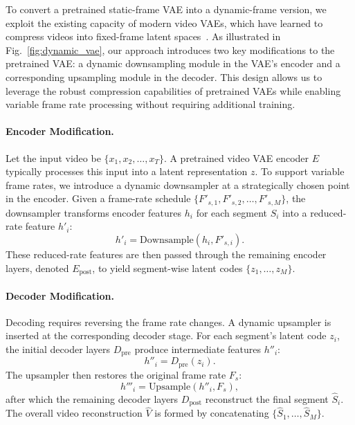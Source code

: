 

To convert a pretrained static-frame VAE into a dynamic-frame version, we exploit the existing capacity of modern video VAEs, which have learned to compress videos into fixed-frame latent spaces~\cite{chen2024deep,xing2024large,zhu2023designing}. As illustrated in Fig.~\ref{fig:dynamic_vae}, our approach introduces two key modifications to the pretrained VAE: a dynamic downsampling module in the VAE's encoder and a corresponding upsampling module in the decoder. This design allows us to leverage the robust compression capabilities of pretrained VAEs while enabling variable frame rate processing without requiring additional training.

\paragraph{Encoder Modification.} Let the input video be $\{x_1,x_2,\ldots,x_T\}$. A pretrained video VAE encoder $E$ typically processes this input into a latent representation $z$. To support variable frame rates, we introduce a dynamic downsampler at a strategically chosen point in the encoder. Given a frame-rate schedule $\{F'_{s,1},F'_{s,2},\ldots,F'_{s,M}\}$, the downsampler transforms encoder features $h_i$ for each segment $S_i$ into a reduced-rate feature $h'_i$:
\begin{equation}
h'_i = \text{Downsample}(h_i, F'_{s,i}).
\label{eq:encoder}
\end{equation}
These reduced-rate features are then passed through the remaining encoder layers, denoted $E_{\text{post}}$, to yield segment-wise latent codes $\{z_1,\ldots,z_M\}$.

\paragraph{Decoder Modification.} Decoding requires reversing the frame rate changes. A dynamic upsampler is inserted at the corresponding decoder stage. For each segment's latent code $z_i$, the initial decoder layers $D_{\text{pre}}$ produce intermediate features $h''_i$:
\begin{equation}
h''_i = D_{\text{pre}}(z_i).
\end{equation}
The upsampler then restores the original frame rate $F_s$:
\begin{equation}
h'''_i = \text{Upsample}(h''_i, F_s),
\label{eq:decoder}
\end{equation}
after which the remaining decoder layers $D_{\text{post}}$ reconstruct the final segment $\hat{S}_i$. The overall video reconstruction $\hat{V}$ is formed by concatenating $\{\hat{S}_1,\ldots,\hat{S}_M\}$.

